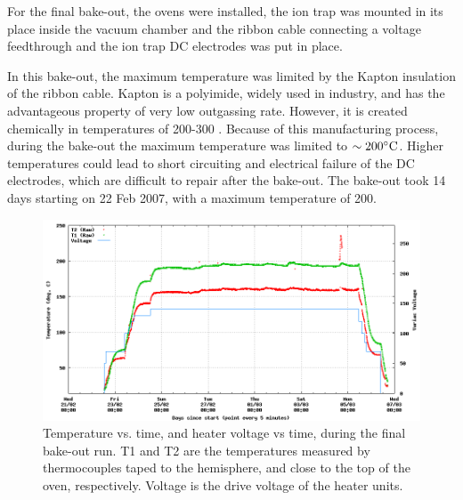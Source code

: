For the final bake-out, the \CaI{} ovens were installed, the ion trap was mounted in its place inside the vacuum chamber and the ribbon cable connecting a voltage feedthrough and the ion trap DC electrodes was put in place. 

In this bake-out, the maximum temperature was limited by the Kapton insulation of the ribbon cable. Kapton is a polyimide, widely used in industry, and has the advantageous property of very low outgassing rate. However, it is created chemically in temperatures of 200-300 \degC. Because of this manufacturing process, during the bake-out the maximum temperature was limited to $\sim 200\mbox{\mbox{$^{\circ}$}{}C}$. Higher temperatures could lead to short circuiting and electrical failure of the DC electrodes, which are difficult to repair after the bake-out. The bake-out took 14 days starting on 22 Feb 2007, with a maximum temperature of 200\degC. 

\begin{figure}[t]
\centering
\includegraphics[width=13cm]{chapter5/bakeout/latest-alldays}
\caption[Final bake-out temperature/voltage record]{Temperature vs. time, and heater voltage vs time, during the final bake-out run. T1 and T2 are the temperatures measured by thermocouples taped to the hemisphere, and close to the top of the oven, respectively. Voltage is the drive voltage of the heater units.  \cversion}
\label{bakeout_timerecord}
\end{figure} 

